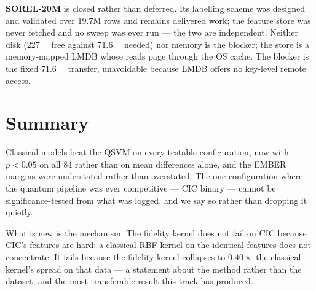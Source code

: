 \documentclass[10pt]{article}
\begin{document}
\textbf{SOREL-20M} is closed rather than deferred. Its labelling scheme was
designed and validated over 19.7M rows and remains delivered work; the feature
store was never fetched and no sweep was ever run --- the two are independent.
Neither disk (\SI{227}{\gibi\byte} free against \SI{71.6}{\gibi\byte} needed) nor
memory is the blocker; the store is a memory-mapped LMDB whose reads page
through the OS cache. The blocker is the fixed \SI{71.6}{\gibi\byte} transfer,
unavoidable because LMDB offers no key-level remote access.

\section{Summary}

Classical models beat the QSVM on every testable configuration, now with
$p<0.05$ on all 84 rather than on mean differences alone, and the EMBER margins
were understated rather than overstated. The one configuration where the quantum
pipeline was ever competitive --- CIC binary --- cannot be significance-tested
from what was logged, and we say so rather than dropping it quietly.

What is new is the mechanism. The fidelity kernel does not fail on CIC because
CIC's features are hard: a classical RBF kernel on the identical features does
not concentrate. It fails because the fidelity kernel collapses to $0.40\times$
the classical kernel's spread on that data --- a statement about the method
rather than the dataset, and the most transferable result this track has
produced.
\end{document}
